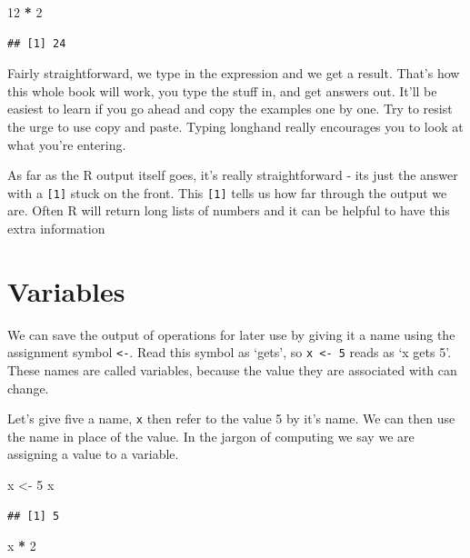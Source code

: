 \documentclass[
]{book}
\newenvironment{Shaded}{\begin{snugshade}}{\end{snugshade}}
\newcommand{\DecValTok}[1]{\textcolor[rgb]{0.00,0.00,0.81}{#1}}
\newcommand{\NormalTok}[1]{#1}
\newcommand{\OperatorTok}[1]{\textcolor[rgb]{0.81,0.36,0.00}{\textbf{#1}}}
\newcommand{\StringTok}[1]{\textcolor[rgb]{0.31,0.60,0.02}{#1}}
\begin{document}
\begin{Shaded}
\begin{Highlighting}[]
 \DecValTok{12} \OperatorTok{*}\StringTok{ }\DecValTok{2}
\end{Highlighting}
\end{Shaded}

\begin{verbatim}
## [1] 24
\end{verbatim}

Fairly straightforward, we type in the expression and we get a result. That's how this whole book will work, you type the stuff in, and get answers out. It'll be easiest to learn if you go ahead and copy the examples one by one. Try to resist the urge to use copy and paste. Typing longhand really encourages you to look at what you're entering.

As far as the R output itself goes, it's really straightforward - its just the answer with a \texttt{{[}1{]}} stuck on the front. This \texttt{{[}1{]}} tells us how far through the output we are. Often R will return long lists of numbers and it can be helpful to have this extra information

\hypertarget{variables}{%
\section{Variables}\label{variables}}

We can save the output of operations for later use by giving it a name using the assignment symbol \texttt{\textless{}-}. Read this symbol as `gets', so \texttt{x\ \textless{}-\ 5} reads as `x gets 5'. These names are called variables, because the value they are associated with can change.

Let's give five a name, \texttt{x} then refer to the value 5 by it's name. We can then use the name in place of the value. In the jargon of computing we say we are assigning a value to a variable.

\begin{Shaded}
\begin{Highlighting}[]
\NormalTok{ x <-}\StringTok{ }\DecValTok{5}
\NormalTok{ x}
\end{Highlighting}
\end{Shaded}

\begin{verbatim}
## [1] 5
\end{verbatim}

\begin{Shaded}
\begin{Highlighting}[]
\NormalTok{ x }\OperatorTok{*}\StringTok{ }\DecValTok{2}
\end{Highlighting}
\end{Shaded}
\end{document}
